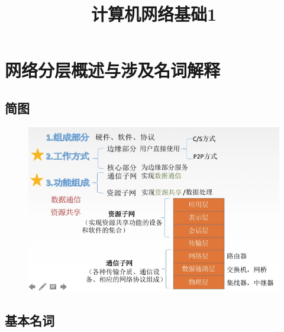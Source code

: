 \documentclass[UTF8]{article}%
\begin{document}


\title{计算机网络基础1}%
\maketitle%

\section{网络分层概述与涉及名词解释}

\subsection{简图}

\begin{figure}[htb!]%
    \includegraphics[width=1.0\textwidth]{1.1-1.png}
    \label{fig::1}
\end{figure}

\subsection{基本名词}
\end{document}
